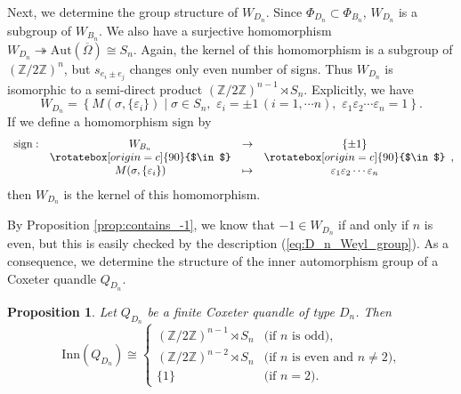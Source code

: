 \documentclass{amsart}
\newtheorem{proposition}[theorem]{Proposition}
\theoremstyle{definition}
\theoremstyle{remark}
\numberwithin{equation}{section}
\begin{document}
Next, we determine the group structure of $W_{D_n}$.
Since $\Phi_{D_n} \subset \Phi_{B_n}$, $W_{D_n}$ is a subgroup of $W_{B_n}$.
We also have a surjective homomorphism 
$W_{D_n} \twoheadrightarrow \mathrm{Aut}(\overline{\Omega}) \cong S_n$.
Again, the kernel of this homomorphism is a subgroup of $(\mathbb{Z} / 2 \mathbb{Z})^n$, 
but $s_{e_i \pm e_j}$ changes only even number of signs.
Thus $W_{D_n}$ is isomorphic to a semi-direct product 
$(\mathbb{Z} / 2 \mathbb{Z})^{n-1} \rtimes S_n$.
Explicitly, we have
\begin{equation}
\label{eq:D_n_Weyl_group}
W_{D_n} = \left\{ M(\sigma , \{ \varepsilon_i \})
\mid \sigma \in S_n , \,\, \varepsilon_i = \pm 1 \, (i = 1, \cdots n)
, \,\, \varepsilon_1 \varepsilon_2 \cdots \varepsilon_n = 1 \right\}.
\end{equation}
If we define a homomorphism $\mathrm{sign}$ by
\[
\begin{array}{cccc}
\mathrm{sign} : & W_{B_n} & \to & \{ \pm 1 \}  \\
& \rotatebox[origin=c]{90}{$\in$} & & \rotatebox[origin=c]{90}{$\in$} \\
& M(\sigma, \{ \varepsilon_i \}) & \mapsto 
& \varepsilon_1 \varepsilon_2 \cdots \varepsilon_n
\end{array},
\]
then $W_{D_n}$ is the kernel of this homomorphism.

By Proposition \ref{prop:contains_-1}, we know that $-1 \in W_{D_n}$ 
if and only if $n$ is even, 
but this is easily checked by the description (\ref{eq:D_n_Weyl_group}). 
As a consequence, we determine the structure of the inner automorphism group 
of a Coxeter quandle $Q_{D_n}$.

\begin{proposition}
Let $Q_{D_n}$ be a finite Coxeter quandle of type $D_n$. Then 
\[
\mathrm{Inn} (Q_{D_n}) \cong 
\begin{cases}
(\mathbb{Z}/2 \mathbb{Z})^{n-1} \rtimes S_n & \textrm{(if $n$ is odd),} \\
(\mathbb{Z}/2 \mathbb{Z})^{n-2} \rtimes S_n & \textrm{(if $n$ is even and $n \neq 2$),} \\
\{ 1 \} & \textrm{(if $n=2$).}
\end{cases}
\]
\end{proposition}
\end{document}
